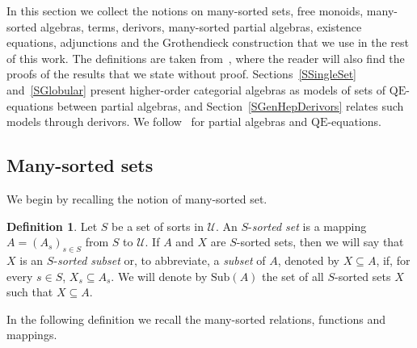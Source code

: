 \documentclass[a4paper, reqno
]{amsart}
\newcommand{\QE}{\mathrm{QE}}
\theoremstyle{plain}
\theoremstyle{definition}
\newtheorem{definition}[theorem]{Definition}
\begin{document}
In this section we collect the notions on many-sorted sets, free monoids, many-sorted algebras, terms, derivors, many-sorted partial algebras, existence equations, adjunctions and the Grothendieck construction that we use in the rest of this work.
The definitions are taken from~\cite{CVCLRM26}, where the reader will also find the proofs of the results that we state without proof.
Sections~\ref{SSingleSet} and~\ref{SGlobular} present higher-order categorial algebras as models of sets of $\QE$-equations between partial algebras, and Section~\ref{SGenHepDerivors} relates such models through derivors.
We follow~\cite{pb86, pb02} for partial algebras and $\QE$-equations.

\subsection{Many-sorted sets}\label{SManySortedSets}

We begin by recalling the notion of many-sorted set.

\begin{definition}\label{DSortedSet}
Let $S$ be a set of sorts in $\boldsymbol{\mathcal{U}}$.
An $S$-\emph{sorted set} is a mapping $A = (A_{s})_{s\in S}$ from $S$ to $\boldsymbol{\mathcal{U}}$.
If $A$ and $X$ are $S$-sorted sets, then we will say that $X$ is an $S$-\emph{sorted subset} or, to abbreviate, a \emph{subset} of $A$, denoted by $X\subseteq A$, if, for every $s\in S$, $X_{s}\subseteq A_{s}$.
We will denote by $\mathrm{Sub}(A)$ the set of all $S$-sorted sets $X$ such that $X\subseteq A$.
\end{definition}

In the following definition we recall the many-sorted relations, functions and mappings.
\end{document}
